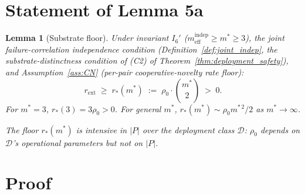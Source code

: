 \documentclass{article}
\newtheorem{lemma}{Lemma}
\newcommand{\rext}{r_{\mathrm{ext}}}
\newcommand{\mindep}{m_{\mathrm{eff}}^{\mathrm{indep}}}
\begin{document}
\section{Statement of Lemma 5a}

\begin{lemma}[Substrate floor]
\label{lem:5a}
Under invariant $I_6'$ ($\mindep \geq m^* \geq 3$), the joint
failure-correlation independence condition
(Definition~\ref{def:joint_indep}, the substrate-distinctness
condition of (C2) of Theorem~\ref{thm:deployment_safety}), and
Assumption~\ref{ass:CN} (per-pair cooperative-novelty rate floor):
\[
  \rext \;\geq\; r_*(m^*) \;:=\; \rho_0 \cdot \binom{m^*}{2} \;>\; 0.
\]
For $m^* = 3$, $r_*(3) = 3\rho_0 > 0$.  For general $m^*$,
$r_*(m^*) \sim \rho_0 m^{*\,2}/2$ as $m^* \to \infty$.

The floor $r_*(m^*)$ is intensive in $|P|$ over the deployment
class $\mathcal{D}$: $\rho_0$ depends on $\mathcal{D}$'s operational
parameters but not on $|P|$.
\end{lemma}

\section{Proof}
\end{document}
